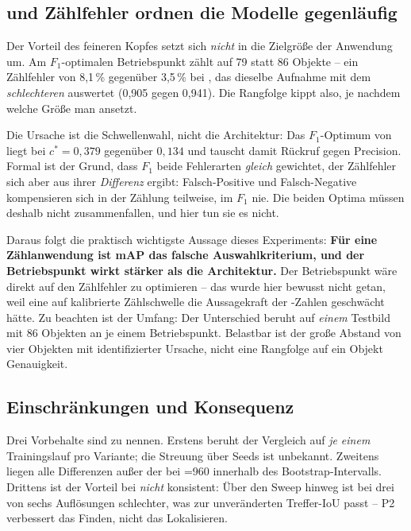 \subsection{\mAPfifty{} und Zählfehler ordnen die Modelle gegenläufig}
\label{sec:p2zaehlung}

Der Vorteil des feineren Kopfes setzt sich \emph{nicht} in die Zielgröße der
Anwendung um. Am $F_1$-optimalen Betriebspunkt zählt  auf
 79 statt 86 Objekte -- ein Zählfehler von 8,1\,\% gegenüber 3,5\,\%
bei , das dieselbe Aufnahme mit dem \emph{schlechteren}
\mAPfifty{} auswertet (0,905 gegen 0,941). Die Rangfolge kippt also, je nachdem
welche Größe man ansetzt.

Die Ursache ist die Schwellenwahl, nicht die Architektur: Das $F_1$-Optimum von
 liegt bei $c^* = 0{,}379$ gegenüber $0{,}134$ und tauscht damit
Rückruf gegen Precision. Formal ist der Grund, dass $F_1$ beide Fehlerarten
\emph{gleich} gewichtet, der Zählfehler sich aber aus ihrer \emph{Differenz}
ergibt: Falsch-Positive und Falsch-Negative kompensieren sich in der Zählung
teilweise, im $F_1$ nie. Die beiden Optima müssen deshalb nicht zusammenfallen,
und hier tun sie es nicht.

Daraus folgt die praktisch wichtigste Aussage dieses Experiments: \textbf{Für
eine Zählanwendung ist mAP das falsche Auswahlkriterium, und der Betriebspunkt
wirkt stärker als die Architektur.} Der Betriebspunkt wäre direkt auf den
Zählfehler zu optimieren -- das wurde hier bewusst nicht getan, weil eine auf
 kalibrierte Zählschwelle die Aussagekraft der -Zahlen
geschwächt hätte. Zu beachten ist der Umfang: Der Unterschied beruht auf
\emph{einem} Testbild mit 86 Objekten an je einem Betriebspunkt. Belastbar ist
der große Abstand von vier Objekten mit identifizierter Ursache, nicht eine
Rangfolge auf ein Objekt Genauigkeit.

\subsection{Einschränkungen und Konsequenz}

Drei Vorbehalte sind zu nennen. Erstens beruht der Vergleich auf \emph{je einem}
Trainingslauf pro Variante; die Streuung über Seeds ist unbekannt. Zweitens
liegen alle Differenzen außer der bei =960 innerhalb des
Bootstrap-Intervalls. Drittens ist der Vorteil bei \mAPall{} \emph{nicht}
konsistent: Über den Sweep hinweg ist  bei drei von sechs
Auflösungen schlechter, was zur unveränderten Treffer-IoU passt -- P2 verbessert
das Finden, nicht das Lokalisieren.


